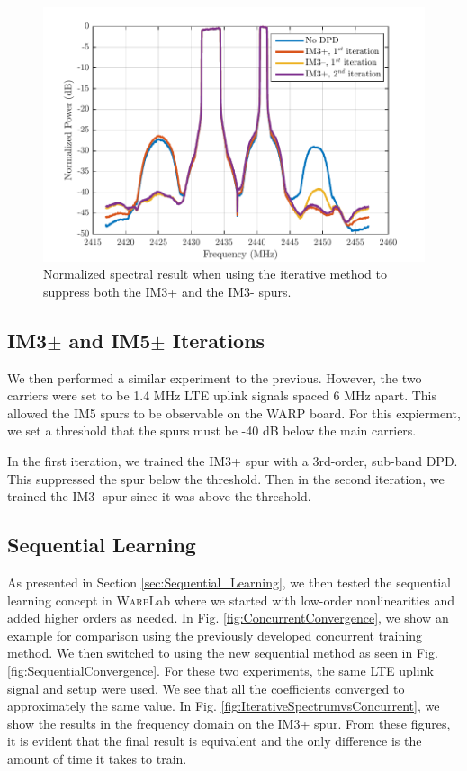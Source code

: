 \begin{figure}[t!] 
\centering
\includegraphics[width=0.9\columnwidth]{Figures/RightThenLeft_NEW}
\caption{Normalized spectral result when using the iterative method to suppress both the IM3+ and the IM3- spurs.}
\label{fig:RightThenLeft}
\end{figure}

\subsection{IM3$\pm$ and IM5$\pm$ Iterations}
We then performed a similar experiment to the previous. However, the two carriers were set to be 1.4 MHz LTE uplink signals spaced 6 MHz apart. This allowed the IM5 spurs to be observable on the WARP board. For this expierment, we set a threshold that the spurs must be -40 dB below the main carriers.

In the first iteration, we trained the IM3+ spur with a 3rd-order, sub-band DPD. This suppressed the spur below the threshold. Then in the second iteration, we trained the IM3- spur since it was above the threshold. 

\subsection{Sequential Learning}
As presented in Section \ref{sec:Sequential_Learning}, we then tested the sequential learning concept in \textsc{Warp}Lab where we started with low-order nonlinearities and added higher orders as needed. 
In Fig. \ref{fig:ConcurrentConvergence}, we show an example for comparison using the previously developed concurrent training method. 
We then switched to using the new sequential method as seen in Fig. \ref{fig:SequentialConvergence}. For these two experiments, the same LTE uplink signal and setup were used. 
We see that all the coefficients converged to approximately the same value. 
In Fig. \ref{fig:IterativeSpectrumvsConcurrent}, we show the results in the frequency domain on the IM3+ spur. 
From these figures, it is evident that the final result is equivalent and the only difference is the amount of time it takes to train.

